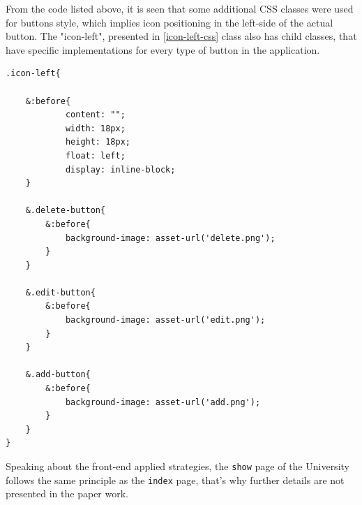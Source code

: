 From the code listed above, it is seen that some additional CSS classes were used for buttons style, which implies icon positioning in the left-side of the actual button. The "icon-left", presented in \autoref{icon-left-css} class also has child classes, that have specific implementations for every type of button in the application. 

\begin{lstlisting}[caption={CSS classes used for buttons design},label={icon-left-css}]
.icon-left{

	&:before{
			content: "";
			width: 18px;
			height: 18px;
			float: left;
			display: inline-block;
	}

	&.delete-button{
		&:before{
			background-image: asset-url('delete.png');
		}
	}

	&.edit-button{
		&:before{
			background-image: asset-url('edit.png');
		}
	}

	&.add-button{
		&:before{
			background-image: asset-url('add.png');
		}
	}
}
\end{lstlisting}
\bigskip

Speaking about the front-end applied strategies, the \texttt{show} page of the University follows the same principle as the \texttt{index} page, that's why further details are not presented in the paper work. 

